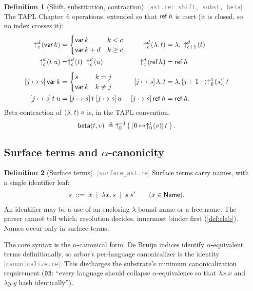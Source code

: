 \documentclass[11pt]{article}
\theoremstyle{definition}
\newtheorem{definition}{Definition}[section]
\theoremstyle{plain}
\theoremstyle{remark}
\newcommand{\src}[1]{{\footnotesize\textcolor{gray}{[\texttt{#1}]}}}
\begin{document}
\begin{definition}[Shift, substitution, contraction]\label{def:beta}
\src{ast.re: shift, subst, beta} The TAPL Chapter~6 operations, extended so that $\mathsf{ref}\,h$ is
inert (it is closed, so no index crosses it):
\begin{align*}
  \shift{d}{c}{\Var{k}} &=
    \begin{cases} \Var{k} & k < c\\ \Var{k+d} & k \ge c\end{cases}
  & \shift{d}{c}{\Lam{t}} &= \Lam{\shift{d}{c+1}{t}}\\
  \shift{d}{c}{\App{t}{u}} &= \App{\shift{d}{c}{t}}{\shift{d}{c}{u}}
  & \shift{d}{c}{\tRef{h}} &= \tRef{h}\\[4pt]
  \subst{j}{s}{\Var{k}} &=
    \begin{cases} s & k = j\\ \Var{k} & k \ne j\end{cases}
  & \subst{j}{s}{\Lam{t}} &= \Lam{\subst{j+1}{\shift{1}{0}{s}}{t}}\\
  \subst{j}{s}{\App{t}{u}} &= \App{\subst{j}{s}{t}}{\subst{j}{s}{u}}
  & \subst{j}{s}{\tRef{h}} &= \tRef{h}.
\end{align*}
Beta-contraction of $(\lambda.\,t)\;v$ is, in the TAPL convention,
\[
  \mathsf{beta}(t, v) \;\triangleq\; \uparrow^{-1}_{0}\!\left(\;[0 \mapsto \uparrow^{1}_{0}\!\left(v\right)]\,t\;\right).
\]
\end{definition}

\subsection{Surface terms and $\alpha$-canonicity}

\begin{definition}[Surface terms]\label{def:surface}
\src{surface\_ast.re} Surface terms carry names, with a single identifier leaf:
\[
  s \;::=\; x \;\mid\; \lambda x.\,s \;\mid\; s\;s'
  \qquad (x \in \mathsf{Name}).
\]
An identifier may be a use of an enclosing $\lambda$-bound name or a free name. The parser
cannot tell which; resolution decides, innermost binder first (\cref{def:elab}). Names occur
only in surface terms.
\end{definition}

The core syntax is the $\alpha$-canonical form. De Bruijn indices identify $\alpha$-equivalent
terms definitionally, so arbor's per-language canonicalizer is the identity
\src{canonicalize.re}. This discharges the substrate's minimum canonicalization requirement
(\texttt{03}: ``every language should collapse $\alpha$-equivalence so that $\lambda x.x$ and
$\lambda y.y$ hash identically'').
\end{document}
